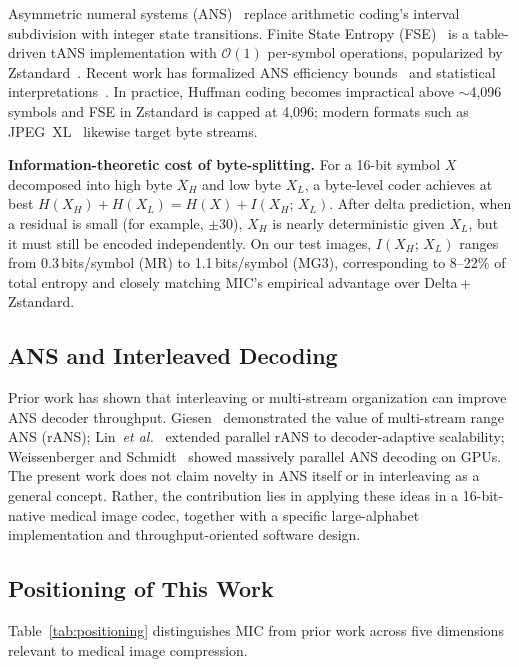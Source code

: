 \documentclass[journal]{IEEEtran}
\begin{document}
Asymmetric numeral systems (ANS)~\cite{duda2009,duda2013} replace arithmetic
coding's interval subdivision with integer state transitions. Finite State
Entropy (FSE)~\cite{fse} is a table-driven tANS implementation with
$\mathcal{O}(1)$ per-symbol operations, popularized by Zstandard~\cite{rfc8878}.
Recent work has formalized ANS efficiency bounds~\cite{kosolobov2022} and
statistical interpretations~\cite{bamler2022}. In practice, Huffman coding
becomes impractical above ${\sim}$4,096 symbols and FSE in Zstandard is capped
at 4,096; modern formats such as JPEG~XL~\cite{jpegxl} likewise target byte
streams.

\textbf{Information-theoretic cost of byte-splitting.} For a 16-bit symbol $X$
decomposed into high byte $X_H$ and low byte $X_L$, a byte-level coder
achieves at best $H(X_H)+H(X_L)=H(X)+I(X_H;\,X_L)$. After delta prediction,
when a residual is small (for example, $\pm 30$), $X_H$ is nearly deterministic
given $X_L$, but it must still be encoded independently. On our test images,
$I(X_H;\,X_L)$ ranges from 0.3\,bits/symbol (MR) to 1.1\,bits/symbol (MG3),
corresponding to 8--22\% of total entropy and closely matching MIC's empirical
advantage over Delta\,+\,Zstandard.

\subsection{ANS and Interleaved Decoding}

Prior work has shown that interleaving or multi-stream organization can improve
ANS decoder throughput. Giesen~\cite{giesen2014,giesen2014b} demonstrated the
value of multi-stream range ANS (rANS); Lin~\textit{et al.}~\cite{lin2023}
extended parallel rANS to decoder-adaptive scalability;
Weissenberger and Schmidt~\cite{weissenberger2019} showed massively parallel
ANS decoding on GPUs. The present work does not claim novelty in ANS itself or
in interleaving as a general concept. Rather, the contribution lies in applying
these ideas in a 16-bit-native medical image codec, together with a specific
large-alphabet implementation and throughput-oriented software design.

\subsection{Positioning of This Work}

Table~\ref{tab:positioning} distinguishes MIC from prior work across five
dimensions relevant to medical image compression.
\end{document}
